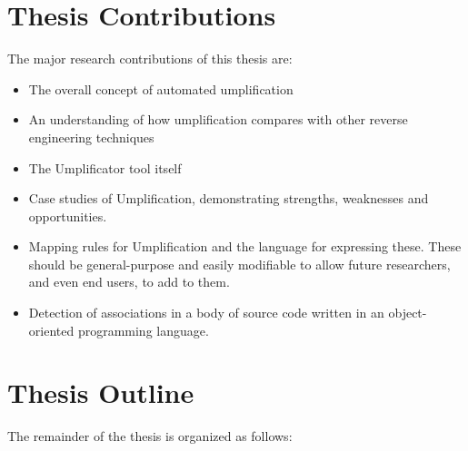\section{Thesis Contributions}

The major research contributions of this thesis are:

\begin{itemize}
\item The overall concept of automated umplification

\item An understanding of how umplification compares with other reverse engineering techniques

\item The Umplificator tool itself

\item Case studies of Umplification, demonstrating strengths, weaknesses and opportunities.

\item Mapping rules for Umplification and the language for expressing these. These should be general-purpose and easily modifiable to allow future researchers, and even end users, to add to them.

\item Detection of associations in a body of source code written in an object-oriented programming language. 
\end{itemize}


\section{Thesis Outline}

The remainder of the thesis is organized as follows:

